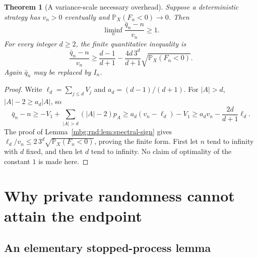 \documentclass[11pt,letterpaper]{article}
\newtheorem{theorem}{Theorem}[section]
\theoremstyle{definition}
\newcommand{\Prb}{\mathbb P}
\begin{document}
\begin{theorem}[A variance-scale necessary overhead]
\label{mbg:rnd:thm:variance-overhead}
Suppose a deterministic strategy has $v_n>0$ eventually and
$\Prb_X(F_n<0)\to0$. Then
\begin{equation}
 \liminf_n\frac{\bar q_n-n}{v_n}\ge1.
 \label{mbg:rnd:eq:variance-overhead}
\end{equation}
For every integer $d\ge2$, the finite quantitative inequality is
\begin{equation}
 \frac{\bar q_n-n}{v_n}\ge
 \frac{d-1}{d+1}
 -\frac{4d\,3^d}{d+1}\sqrt{\Prb_X(F_n<0)}.
 \label{mbg:rnd:eq:variance-overhead-finite}
\end{equation}
Again $\bar q_n$ may be replaced by $I_n$.
\end{theorem}
\begin{proof}
Write $\ell_d=\sum_{j\le d}V_j$ and $a_d=(d-1)/(d+1)$.
For $|A|>d$, $|A|-2\ge a_d|A|$, so
\[
 \bar q_n-n\ge -V_1+\sum_{|A|>d}(|A|-2)p_A
 \ge a_d(v_n-\ell_d)-V_1
 \ge a_dv_n-\frac{2d}{d+1}\ell_d.
\]
The proof of Lemma~\ref{mbg:rnd:lem:spectral-sign} gives
$\ell_d/v_n\le2\,3^d\sqrt{\Prb_X(F_n<0)}$, proving the finite form.
First let $n$ tend to infinity with $d$ fixed, and then let $d$ tend
to infinity. No claim of optimality of the constant $1$ is made here.
\end{proof}

\section{Why private randomness cannot attain the endpoint}
\label{mbg:rnd:sec:private-endpoint}

\subsection{An elementary stopped-process lemma}
\end{document}
